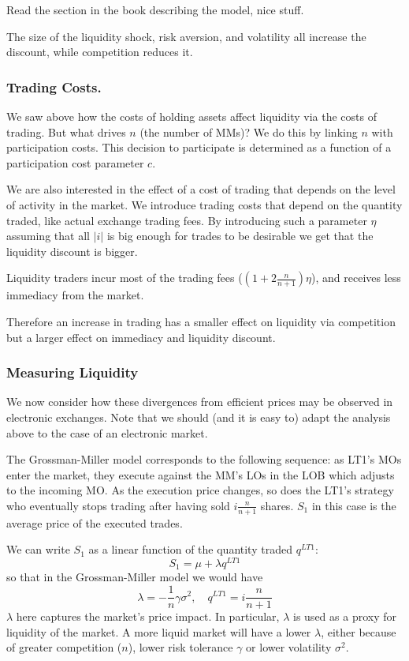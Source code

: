 \documentclass[11pt,a4paper]{article}
\theoremstyle{definition}
\theoremstyle{plain}
\theoremstyle{remark}
\newcommand{\1}{\mathbbm{1}}
\begin{document}
Read the section in the book describing the model, nice stuff. 

The size of the liquidity shock, risk aversion, 
and volatility all increase the discount, while competition reduces it. 

\subsubsection{Trading Costs.} 
We saw above how the costs of holding assets affect liquidity via the costs of trading. But what drives $n$ (the number of MMs)? 
We do this by linking $n$ with participation costs. This decision to participate is determined as a function of a participation cost parameter
$c$. 

We are also interested in the effect of a cost of trading that depends on the level of activity in the market. 
We introduce trading costs that depend on the quantity traded, like actual exchange trading fees. By introducing such a 
parameter $\eta$ assuming that all $|i|$ is big enough for trades to be desirable we get that the liquidity discount is bigger. 

Liquidity traders incur most of the trading fees ($(1 + 2 \frac{n}{n+1})\eta$), and receives less immediacy from the market. 

Therefore an increase in trading has a smaller effect on liquidity via competition but a larger effect on immediacy and liquidity discount. 

\subsubsection{Measuring Liquidity}
We now consider how these divergences from efficient prices may be observed in electronic exchanges. 
Note that we should (and it is easy to) adapt the analysis above to the case of an electronic market. 

The Grossman-Miller model corresponds to the following sequence: as LT1's MOs enter the market, they execute against the MM's LOs in the 
LOB which adjusts to the incoming MO. As the execution price changes, so does the LT1's strategy who eventually stops trading after having sold 
$i \frac{n}{n+1}$ shares. $S_1$ in this case is the average price of the executed trades. 

We can write $S_1$ as a linear function of the quantity traded $q^{LT1}$: 
$$S_1 = \mu + \lambda q^{LT1}$$
so that in the Grossman-Miller model we would have 
$$\lambda = -\frac{1}{n} \gamma \sigma^2, \quad q^{LT1} = i \frac{n}{n+1}$$
$\lambda$ here captures the market's price impact. In particular, $\lambda$ is used as a proxy for liquidity of the market. 
A more liquid market will have a lower $\lambda$, either because of greater competition ($n$), lower risk tolerance $\gamma$ or lower 
volatility $\sigma^2$. 
\end{document}
